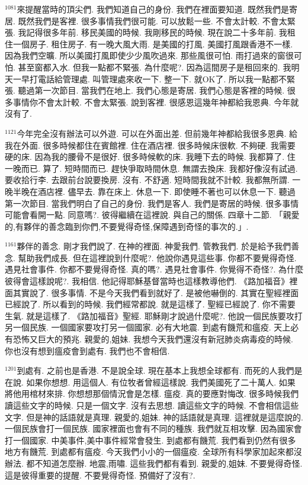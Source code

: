 \documentclass{book}
\begin{document}
$^{1081}$來提醒當時的頂尖們.
我們知道自己的身份.
我們在裡面要知道.
既然我們是寄居.
既然我們是客裡.
很多事情我們很可能.
可以放鬆一些.
不會太計較.
不會太緊張.
我記得很多年前.
移民美國的時候.
我剛移民的時候.
現在說二十多年前.
我租住一個房子.
租住房子.
有一晚大風大雨.
是美國的打風.
美國打風跟香港不一樣.
因為我們空曠.
所以美國打風即使少少風吹過來.
那些風很可怕.
雨打過來的窗很可怕.
甚至窗都入水.
但我一點都不緊張.
為什麼呢?.
因為這間房子是租回來的.
我明天一早打電話給管理處.
叫管理處來收一下.
整一下.
就OK了.
所以我一點都不緊張.
聽過第一次節目.
當我們在地上.
我們心態是寄居.
我們心態是客裡的時候.
很多事情你不會太計較.
不會太緊張.
說到客裡.
很感恩這幾年神都給我恩典.
今年就沒有了.

$^{1121}$今年完全沒有辦法可以外遊.
可以在外面出差.
但前幾年神都給我很多恩典.
給我在外面.
很多時候都住在賓館裡.
住在酒店裡.
很多時候床很軟.
不夠硬.
我需要硬的床.
因為我的腰骨不是很好.
很多時候軟的床.
我睡下去的時候.
我都算了.
住一晚而已.
算了.
短時間而已.
趕快爭取時間休息.
無謂去換床.
我都好像沒有試過.
要收拾行李.
去跟前台說要換房.
沒有.
不舒適.
短時間我就不計較.
我都無所謂.
一晚半晚在酒店裡.
儘早去.
靠在床上.
休息一下.
即使睡不著也可以休息一下.
聽過第一次節目.
當我們明白了自己的身份.
我們是客人.
我們是寄居的時候.
很多事情可能會看開一點.
同意嗎?.
彼得繼續在這裡說.
與自己的關係.
四章十二節.
「親愛的,有夥伴的善念臨到你們,不要覺得奇怪,保障遇到奇怪的事次的.」.

$^{1161}$夥伴的善念.
剛才我們說了.
在神的裡面.
神愛我們.
管教我們.
於是給予我們善念.
幫助我們成長.
但在這裡說到什麼呢?.
他說你遇見這些事.
你都不要覺得奇怪.
遇見社會事件.
你都不要覺得奇怪.
真的嗎?.
遇見社會事件.
你覺得不奇怪?.
為什麼彼得會這樣說呢?.
我相信.
他記得耶穌基督當時也這樣教導他們.
《路加福音》裡面其實說了.
很多事情.
不是今天我們看到就好了.
是被他嚇倒的.
其實在聖經裡面已經說了.
所以看到的時候.
我們經常都說.
就是這樣了.
聖經已經說了.
你不需要生氣.
就是這樣了.
《路加福音》聖經.
耶穌剛才說過什麼呢?.
他說一個民族要攻打另一個民族.
一個國家要攻打另一個國家.
必有大地震.
到處有饑荒和瘟疫.
天上必有恐怖又巨大的預兆.
親愛的,姐妹.
我想今天我們還沒有新冠肺炎病毒疫的時候.
你也沒有想到瘟疫會到處有.
我們也不會相信.

$^{1201}$到處有.
之前也是香港.
不是說全球.
現在基本上我想全球都有.
而死的人我們是在說.
如果你想想.
用這個人.
有位牧者曾經這樣說.
我們美國死了二十萬人.
如果將他用棺材來排.
你想想那個情況會是怎樣.
瘟疫.
真的要應對悔改.
很多時候我們讀這些文字的時候.
只是一個文字.
沒有去思想.
讀這些文字的時候.
不會相信這些文字.
但是神的話語就是真理.
親愛的,姐妹.
神的話語就是真理.
這裡就是這麼說的.
一個民族會打一個民族.
國家裡面也會有不同的種族.
我們就互相攻擊.
因為國家會打一個國家.
中美事件,美中事件經常會發生.
到處都有饑荒.
我們看到仍然有很多地方有饑荒.
到處都有瘟疫.
今天我們小小的一個瘟疫.
全球所有科學家加起來都沒辦法.
都不知道怎麼辦.
地震,雨嘯.
這些我們都有看到.
親愛的,姐妹.
不要覺得奇怪.
這是彼得重要的提醒.
不要覺得奇怪.
預備好了沒有?.
\end{document}
